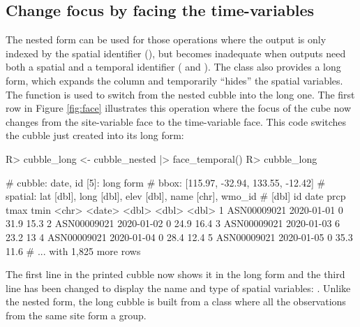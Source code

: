\documentclass[
]{jss}
\begin{document}
\hypertarget{change-focus-by-facing-the-time-variables}{%
\subsection{Change focus by facing the time-variables}\label{change-focus-by-facing-the-time-variables}}

The nested form can be used for those operations where the output is only indexed by the spatial identifier (), but becomes inadequate when outputs need both a spatial and a temporal identifier ( and ). The  class also provides a long form, which expands the  column and temporarily ``hides'' the spatial variables. The function  is used to switch from the nested cubble into the long one. The first row in Figure \ref{fig:face} illustrates this operation where the focus of the cube now changes from the site-variable face to the time-variable face. This code switches the cubble just created into its long form:

\begin{CodeChunk}
\begin{CodeInput}
R> cubble_long <- cubble_nested |> face_temporal()
R> cubble_long
\end{CodeInput}
\begin{CodeOutput}
# cubble:  date, id [5]: long form
# bbox:    [115.97, -32.94, 133.55, -12.42]
# spatial: lat [dbl], long [dbl], elev [dbl], name [chr], wmo_id
#   [dbl]
  id          date        prcp  tmax  tmin
  <chr>       <date>     <dbl> <dbl> <dbl>
1 ASN00009021 2020-01-01     0  31.9  15.3
2 ASN00009021 2020-01-02     0  24.9  16.4
3 ASN00009021 2020-01-03     6  23.2  13  
4 ASN00009021 2020-01-04     0  28.4  12.4
5 ASN00009021 2020-01-05     0  35.3  11.6
# ... with 1,825 more rows
\end{CodeOutput}
\end{CodeChunk}

The first line in the printed cubble now shows it in the long form and the third line has been changed to display the name and type of spatial variables: . Unlike the nested form, the long cubble is built from a  class where all the observations from the same site form a group.
\end{document}
